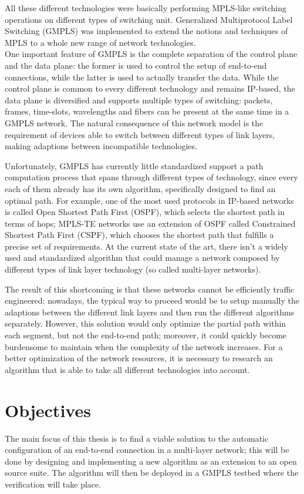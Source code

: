 \documentclass[10pt,a4paper]{report}
\begin{document}
All these different technologies were basically performing MPLS-like
switching operations on different types of switching unit. Generalized
Multiprotocol Label Switching (GMPLS) was implemented to extend the
notions and techniques of MPLS to a whole new range of network
technologies. \\
One important feature of GMPLS is the complete separation of the
control plane and the data plane: the former is used to control the
setup of end-to-end connections, while the latter is used to actually
transfer the data. While the control plane is common to every
different technology and remains IP-based, the data plane is
diversified and supports multiple types of switching: packets, frames,
time-slots, wavelengths and fibers can be present at the same time in
a GMPLS network. The natural consequence of this network model is the
requirement of devices able to switch between different types of link
layers, making adaptions between incompatible technologies.

Unfortunately, GMPLS has currently little standardized support a path
computation process that spans through different types of technology,
since every each of them already has its own algorithm, specifically
designed to find an optimal path. For example, one of the most used
protocols in IP-based networks is called Open Shortest Path First
(OSPF), which selects the shortest path in terms of hops; MPLS-TE
networks use an extension of OSPF called Constrained Shortest Path
First (CSPF), which chooses the shortest path that fulfills a precise
set of requirements. At the current state of the art, there isn't a
widely used and standardized algorithm that could manage a network
composed by different types of link layer technology (so called
multi-layer networks).

The result of this shortcoming is that these networks cannot be
efficiently traffic engineered: nowadays, the typical way to proceed
would be to setup manually the adaptions between the different link
layers and then run the different algorithms separately. However, this
solution would only optimize the partial path within each segment, but
not the end-to-end path; moreover, it could quickly become burdensome
to maintain when the complexity of the network increases. For a better
optimization of the network resources, it is necessary to research an
algorithm that is able to take all different technologies into
account.

\newpage

\section{Objectives}
The main focus of this thesis is to find a viable solution to the
automatic configuration of an end-to-end connection in a multi-layer
network; this will be done by designing and implementing a new
algorithm as an extension to an open source suite. The algorithm will
then be deployed in a GMPLS testbed where the verification will take
place.
\end{document}
